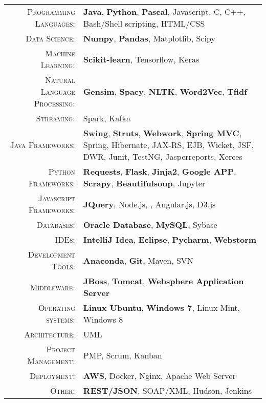%
%
%

\renewcommand{\arraystretch}{1.1}

	\begin{tabular}{>{}r>{}p{13cm}} 
		\textsc{Programming Languages:}  		&   \textbf{Java}, \textbf{Python}, \textbf{Pascal},  Javascript, C, C++, Bash/Shell scripting, HTML/CSS\\ 
		\textsc{Data Science:}                  &   \textbf{Numpy}, \textbf{Pandas}, Matplotlib, Scipy\\
		\textsc{Machine Learning:}				 &  \textbf{Scikit-learn}, Tensorflow, Keras\\
		\textsc{Natural Language Processing:} 	 & \textbf{Gensim}, \textbf{Spacy}, \textbf{NLTK}, \textbf{Word2Vec}, \textbf{Tfidf}\\
		\textsc{Streaming:}                  	&   Spark, Kafka\\
		\textsc{Java Frameworks:} 				& \textbf{Swing},  \textbf{Struts}, \textbf{Webwork}, \textbf{Spring MVC}, Spring, Hibernate, JAX-RS, EJB, Wicket, JSF, DWR, Junit, TestNG, Jasperreports, Xerces\\
		\textsc{Python Frameworks:} 				& \textbf{Requests}, \textbf{Flask}, \textbf{Jinja2}, \textbf{Google APP},  \textbf{Scrapy}, \textbf{Beautifulsoup}, Jupyter\\ 
		\textsc{Javascript Frameworks:} 				& \textbf{JQuery}, Node.js, , Angular.js, D3.js \\
		\textsc{Databases:}                  &   \textbf{Oracle Database}, \textbf{MySQL}, Sybase \\ 
		\textsc{IDEs:}	  		&   \textbf{IntelliJ Idea}, \textbf{Eclipse}, \textbf{Pycharm}, \textbf{Webstorm}  \\ 
		\textsc{Development Tools:} & 	  		\textbf{Anaconda}, \textbf{Git}, Maven, SVN \\
		\textsc{Middleware:}				        &   \textbf{JBoss}, \textbf{Tomcat}, \textbf{Websphere Application Server} \\ 
		\textsc{Operating systems:}	        &   \textbf{Linux Ubuntu}, \textbf{Windows 7}, Linux Mint, Windows 8\\ 
		\textsc{Architecture:}				        &   UML \\
		\textsc{Project Management:}				        &   PMP, Scrum, Kanban \\
		\textsc{Deployment:}				        &   \textbf{AWS}, Docker, Nginx, Apache Web Server\\
		\textsc{Other:}					        &   \textbf{REST/JSON}, SOAP/XML, Hudson, Jenkins \\
	\end{tabular}